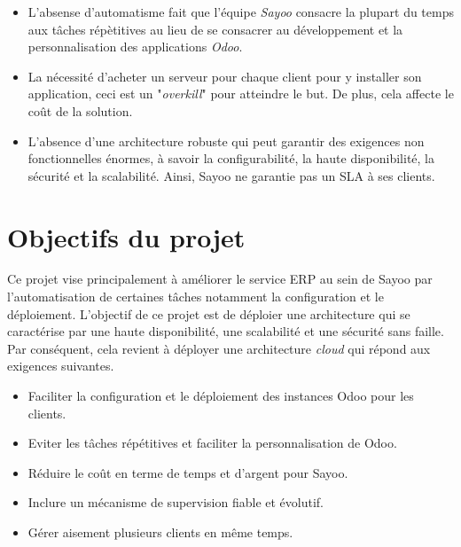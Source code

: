 \begin{onehalfspace}
\begin{itemize}
\item L'absense d'automatisme fait que l'équipe \emph{Sayoo} consacre la plupart du temps aux tâches répètitives au lieu de se consacrer au développement et la personnalisation des applications \emph{Odoo}. 

\item La nécessité d'acheter un serveur pour chaque client pour y installer son application, ceci est un "\emph{overkill}" pour atteindre le but. De plus, cela affecte le coût de la solution.

\item L'absence d'une architecture robuste qui peut garantir des exigences non fonctionnelles énormes, à savoir la configurabilité, la haute disponibilité, la sécurité et la scalabilité. Ainsi, Sayoo ne garantie pas un SLA à ses clients.

\end{itemize}




\section{Objectifs du projet}
Ce projet vise principalement à améliorer le service ERP au sein de Sayoo par l'automatisation de certaines tâches notamment la configuration et le déploiement. L'objectif de ce projet est de déploier une architecture qui se caractérise par une haute disponibilité, une scalabilité et une sécurité sans faille. Par conséquent, cela revient à déployer une architecture \emph{cloud} qui répond aux exigences suivantes.
\begin{itemize}

\item Faciliter la configuration et le déploiement des instances Odoo pour les clients.

\item Eviter les tâches répétitives et faciliter la personnalisation de Odoo.

\item Réduire le coût en terme de temps et d'argent pour Sayoo.

\item Inclure un mécanisme de supervision fiable et évolutif.

\item Gérer aisement plusieurs clients en même temps.  
 
 \end{itemize}







\end{onehalfspace}
